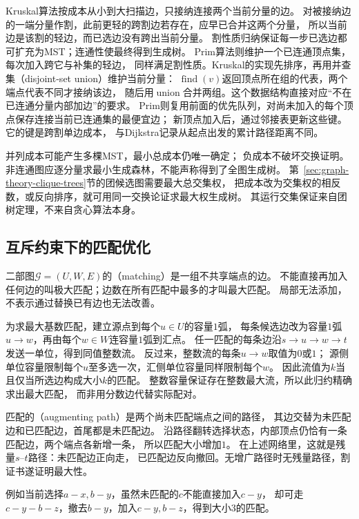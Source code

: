 Kruskal算法按成本从小到大扫描边，只接纳连接两个当前分量的边。
对被接纳边的一端分量作割，此前更轻的跨割边若存在，应早已合并这两个分量，
所以当前边是该割的轻边，而已选边没有跨出当前分量。
割性质归纳保证每一步已选边都可扩充为MST；连通性使最终得到生成树。
Prim算法则维护一个已连通顶点集，每次加入跨它与补集的轻边，
同样满足割性质。Kruskal的实现先排序，再用并查集（disjoint-set union）维护当前分量：
\(\operatorname{find}(v)\)返回顶点所在组的代表，两个端点代表不同才接纳该边，
随后用\(\operatorname{union}\)合并两组。这个数据结构直接对应“不在已连通分量内部加边”的要求。
Prim则复用前面的优先队列，对尚未加入的每个顶点保存连接当前已连通集的最便宜边；
新顶点加入后，通过邻接表更新这些键。它的键是跨割单边成本，
与Dijkstra记录从起点出发的累计路径距离不同。

并列成本可能产生多棵MST，最小总成本仍唯一确定；
负成本不破坏交换证明。非连通图应逐分量求最小生成森林，不能声称得到了全图生成树。
第~\ref{sec:graph-theory-clique-trees}节的团候选图需要最大总交集权，
把成本改为交集权的相反数，或反向排序，就可用同一交换论证求最大权生成树。
其运行交集保证来自团树定理，不来自贪心算法本身。

\subsection{互斥约束下的匹配优化}

二部图\(\mathcal G=(U,W,E)\)的（matching）是一组不共享端点的边。
不能直接再加入任何边的叫极大匹配；边数在所有匹配中最多的才叫最大匹配。
局部无法添加，不表示通过替换已有边也无法改善。

为求最大基数匹配，建立源点到每个\(u\in U\)的容量\(1\)弧，
每条候选边改为容量\(1\)弧\(u\to w\)，再由每个\(w\in W\)连容量\(1\)弧到汇点。
任一匹配的每条边沿\(s\to u\to w\to t\)发送一单位，得到同值整数流。
反过来，整数流的每条\(u\to w\)取值为\(0\)或\(1\)；
源侧单位容量限制每个\(u\)至多选一次，汇侧单位容量同样限制每个\(w\)。
因此流值为\(k\)当且仅当所选边构成大小\(k\)的匹配。
整数容量保证存在整数最大流，所以此归约精确求出最大匹配，
而非用分数边代替实际配对。

匹配的（augmenting path）是两个尚未匹配端点之间的路径，
其边交替为未匹配边和已匹配边，首尾都是未匹配边。
沿路径翻转选择状态，内部顶点仍恰有一条匹配边，两个端点各新增一条，
所以匹配大小增加\(1\)。
在上述网络里，这就是残量\(s\)--\(t\)路径：未匹配边正向走，
已匹配边反向撤回。无增广路径时无残量路径，割证书遂证明最大性。

例如当前选择\(a-x,b-y\)，虽然未匹配的\(c\)不能直接加入\(c-y\)，
却可走\(c-y-b-z\)，撤去\(b-y\)，加入\(c-y,b-z\)，得到大小\(3\)的匹配。

